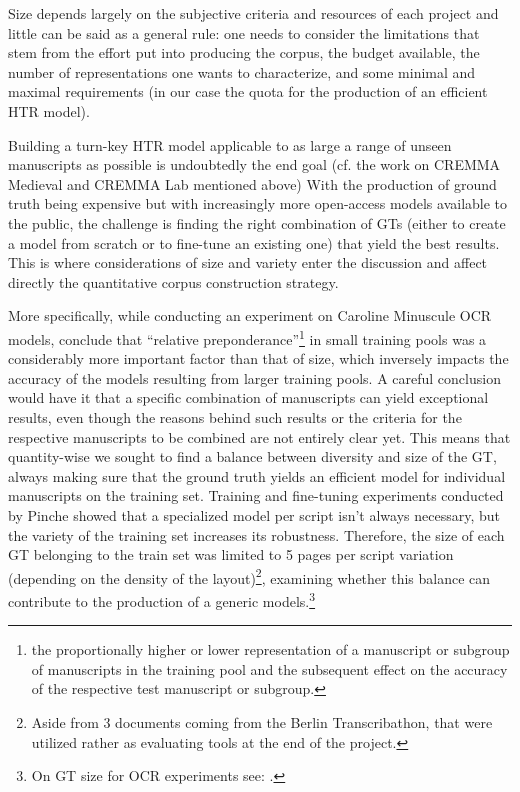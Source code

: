 \documentclass{article}
\begin{document}
Size depends largely on the subjective criteria and resources of each project and little can be said as a general rule: one needs to consider the limitations that stem from the effort put into producing the corpus, the budget available, the number of representations one wants to characterize, and some minimal and maximal requirements (in our case the quota for the production of an efficient HTR model).

Building a turn-key HTR model applicable to as large a range of unseen manuscripts as possible is undoubtedly the end goal (cf. the work on CREMMA Medieval and CREMMA Lab mentioned above) With the production of ground truth being expensive but with increasingly more open-access models available to the public, the challenge is finding the right combination of GTs (either to create a model from scratch or to fine-tune an existing one) that yield the best results. This is where considerations of size and variety enter the discussion and affect directly the quantitative corpus construction strategy.

More specifically, while conducting an experiment on Caroline Minuscule OCR models, \cite{hawk2018modelling} conclude that \enquote{relative preponderance}\footnote{the proportionally higher or lower representation of a manuscript or subgroup of manuscripts in the training pool and the subsequent effect on the accuracy of the respective test manuscript or subgroup.} in small training pools was a considerably more important factor than that of size, which inversely impacts the accuracy of the models resulting from larger training pools. A careful conclusion would have it that a specific combination of manuscripts can yield exceptional results, even though the reasons behind such results or the criteria for the respective manuscripts to be combined are not entirely clear yet. This means that quantity-wise we sought to find a balance between diversity and size of the GT, always making sure that the ground truth yields an efficient model for individual manuscripts on the training set. Training and fine-tuning experiments conducted by Pinche showed that a specialized model per script isn’t always necessary, but the variety of the training set increases its robustness. Therefore, the size of each GT belonging to the train set  was limited to 5 pages per script variation (depending on the density of the layout)\footnote{Aside from 3 documents coming from the Berlin Transcribathon, that were utilized rather as evaluating tools at the end of the project.}, examining whether this balance can contribute to the production of a generic models.\footnote{On GT size for OCR experiments see: \cite{strobel2020much}.}
\end{document}

